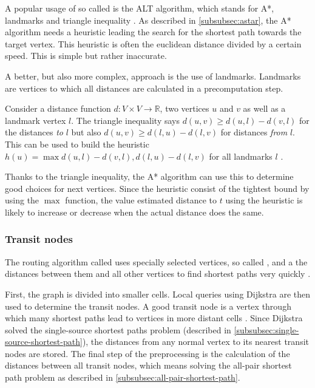 			A popular usage of so called  is the ALT algorithm, which stands for A*, landmarks and triangle inequality \cite{goldberg-landmarks}.
			As described in \cref{subsubsec:astar}, the A* algorithm needs a heuristic leading the search for the shortest path towards the target vertex.
			This heuristic is often the euclidean distance divided by a certain speed.
			This is simple but rather inaccurate.
			
			A better, but also more complex, approach is the use of landmarks.
			Landmarks are vertices to which all distances are calculated in a precomputation step.
			
			Consider a distance function $d : V \times V \rightarrow \mathbb{R}$, two vertices $u$ and $v$ as well as a landmark vertex $l$.
			The triangle inequality says $d(u,v) \geq d(u,l) - d(v,l)$ for the distances \emph{to} $l$ but also $d(u,v) \geq d(l,u) - d(l,v)$ for distances \emph{from} $l$.
			This can be used to build the heuristic $h(u) = \max{d(u,l)-d(v,l), d(l,u)-d(l,v)}$ for all landmarks $l$ \cite[6-7]{goldberg-landmarks}.
			
			Thanks to the triangle inequality, the A* algorithm can use this to determine good choices for next vertices.
			Since the heuristic consist of the tightest bound by using the $\max$ function, the value estimated distance to $t$ using the heuristic is likely to increase or decrease when the actual distance does the same.
		
		\subsubsection{Transit nodes}
		\label{subsubsec:transit}
		
			The routing algorithm called  uses specially selected vertices, so called , and a the distances between them and all other vertices to find shortest paths very quickly \cite{bast-transit}.
		
			First, the graph is divided into smaller cells.
			Local queries using Dijkstra are then used to determine the transit nodes.
			A good transit node is a vertex through which many shortest paths lead to vertices in more distant cells \cite[6]{bast-transit}. 
			Since Dijkstra solved the single-source shortest paths problem (described in \cref{subsubsec:single-source-shortest-path}), the distances from any normal vertex to its nearest transit nodes are stored.
			The final step of the preprocessing is the calculation of the distances between all transit nodes, which means solving the all-pair shortest path problem as described in \cref{subsubsec:all-pair-shortest-path}.
			
